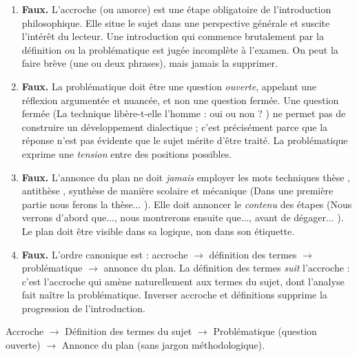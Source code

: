 \documentclass[11pt]{article}
\newcommand{\cle}[1]{{\popxbold\color{popdark}#1}}
\begin{document}
\begin{corrige}
\begin{enumerate}
\item \textbf{Faux.} L'\cle{accroche} (ou amorce) est une étape obligatoire de l'introduction philosophique. Elle situe le sujet dans une perspective générale et suscite l'intérêt du lecteur. Une introduction qui commence brutalement par la définition ou la problématique est jugée incomplète à l'examen. On peut la faire brève (une ou deux phrases), mais jamais la supprimer.

\item \textbf{Faux.} La \cle{problématique} doit être une question \emph{ouverte}, appelant une réflexion argumentée et nuancée, et non une question fermée. Une question fermée (\og La technique libère-t-elle l'homme : oui ou non ? \fg{}) ne permet pas de construire un développement dialectique ; c'est précisément parce que la réponse n'est pas évidente que le sujet mérite d'être traité. La problématique exprime une \emph{tension} entre des positions possibles.

\item \textbf{Faux.} L'annonce du plan ne doit \emph{jamais} employer les mots techniques \og thèse \fg{}, \og antithèse \fg{}, \og synthèse \fg{} de manière scolaire et mécanique (\og Dans une première partie nous ferons la thèse... \fg{}). Elle doit annoncer le \emph{contenu} des étapes (\og Nous verrons d'abord que..., nous montrerons ensuite que..., avant de dégager... \fg{}). Le plan doit être visible dans sa logique, non dans son étiquette.

\item \textbf{Faux.} L'ordre canonique est : accroche $\rightarrow$ définition des termes $\rightarrow$ problématique $\rightarrow$ annonce du plan. La définition des termes \emph{suit} l'accroche : c'est l'accroche qui amène naturellement aux termes du sujet, dont l'analyse fait naître la problématique. Inverser accroche et définitions supprime la progression de l'introduction.
\end{enumerate}

\begin{aretenir}
Accroche $\rightarrow$ Définition des termes du sujet $\rightarrow$ Problématique (question ouverte) $\rightarrow$ Annonce du plan (sans jargon méthodologique).
\end{aretenir}
\end{corrige}
\end{document}
